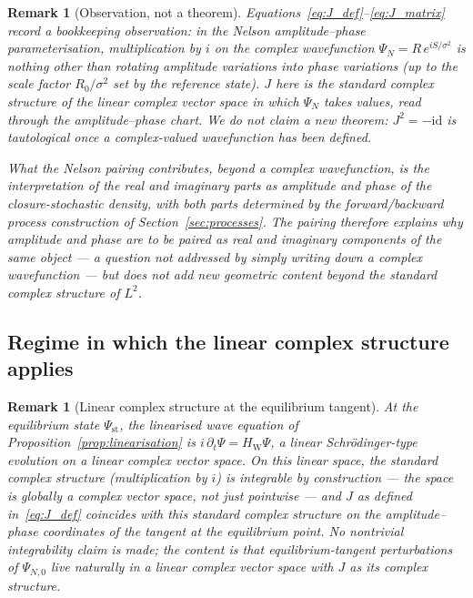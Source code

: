 \documentclass[12pt]{article}
\newtheorem{remark}[theorem]{Remark}
\begin{document}
\begin{remark}[Observation, not a theorem]\label{prop:J}
Equations~\eqref{eq:J_def}--\eqref{eq:J_matrix} record a bookkeeping observation: in the Nelson amplitude--phase parameterisation, multiplication by $i$ on the complex wavefunction $\Psi_N = R\,e^{iS/\sigma^2}$ is nothing other than rotating amplitude variations into phase variations (up to the scale factor $R_0/\sigma^2$ set by the reference state). $J$ here is the standard complex structure of the linear complex vector space in which $\Psi_N$ takes values, read through the amplitude--phase chart. We do not claim a new theorem: $J^2 = -\mathrm{id}$ is tautological once a complex-valued wavefunction has been defined.

What the Nelson pairing contributes, beyond a complex wavefunction, is the \emph{interpretation} of the real and imaginary parts as amplitude and phase of the closure-stochastic density, with both parts determined by the forward/backward process construction of Section~\ref{sec:processes}. The pairing therefore explains \emph{why} amplitude and phase are to be paired as real and imaginary components of the same object --- a question not addressed by simply writing down a complex wavefunction --- but does not add new geometric content beyond the standard complex structure of $L^2$.
\end{remark}

\subsection{Regime in which the linear complex structure applies}\label{subsec:J_integrable}

\begin{remark}[Linear complex structure at the equilibrium tangent]\label{rem:J_integrable}
At the equilibrium state $\Psi_{\mathrm{st}}$, the linearised wave equation of Proposition~\ref{prop:linearisation} is $i\,\partial_t\Psi = H_{\mathrm{W}}\Psi$, a linear Schr\"odinger-type evolution on a linear complex vector space. On this linear space, the standard complex structure (multiplication by $i$) is integrable by construction --- the space is globally a complex vector space, not just pointwise --- and $J$ as defined in~\eqref{eq:J_def} coincides with this standard complex structure on the amplitude--phase coordinates of the tangent at the equilibrium point. No nontrivial integrability claim is made; the content is that equilibrium-tangent perturbations of $\Psi_{N,0}$ live naturally in a linear complex vector space with $J$ as its complex structure.
\end{remark}
\end{document}
